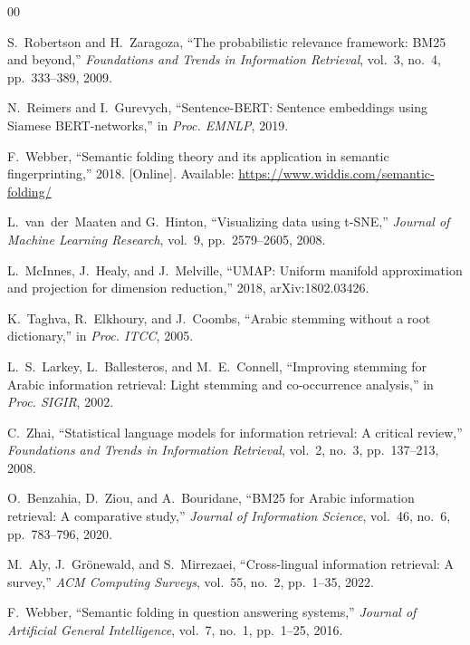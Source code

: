 \documentclass[conference]{IEEEtran}
\begin{document}
\clearpage
\begin{thebibliography}{00}

S.~Robertson and H.~Zaragoza, ``The probabilistic relevance framework:
BM25 and beyond,'' \textit{Foundations and Trends in Information
Retrieval}, vol.~3, no.~4, pp.~333--389, 2009.

N.~Reimers and I.~Gurevych, ``Sentence-BERT: Sentence embeddings using
Siamese BERT-networks,'' in \textit{Proc. EMNLP}, 2019.

F.~Webber, ``Semantic folding theory and its application in semantic
fingerprinting,'' 2018. [Online]. Available:
\url{https://www.widdis.com/semantic-folding/}

L.~van~der~Maaten and G.~Hinton, ``Visualizing data using t-SNE,''
\textit{Journal of Machine Learning Research}, vol.~9, pp.~2579--2605,
2008.

L.~McInnes, J.~Healy, and J.~Melville, ``UMAP: Uniform manifold
approximation and projection for dimension reduction,'' 2018,
arXiv:1802.03426.

K.~Taghva, R.~Elkhoury, and J.~Coombs, ``Arabic stemming without a root
dictionary,'' in \textit{Proc. ITCC}, 2005.

L.~S.~Larkey, L.~Ballesteros, and M.~E.~Connell, ``Improving stemming
for Arabic information retrieval: Light stemming and co-occurrence
analysis,'' in \textit{Proc. SIGIR}, 2002.

C.~Zhai, ``Statistical language models for information retrieval: A
critical review,'' \textit{Foundations and Trends in Information
Retrieval}, vol.~2, no.~3, pp.~137--213, 2008.

O.~Benzahia, D.~Ziou, and A.~Bouridane, ``BM25 for Arabic information
retrieval: A comparative study,'' \textit{Journal of Information
Science}, vol.~46, no.~6, pp.~783--796, 2020.

M.~Aly, J.~Gr\"{o}newald, and S.~Mirrezaei, ``Cross-lingual information
retrieval: A survey,'' \textit{ACM Computing Surveys}, vol.~55, no.~2,
pp.~1--35, 2022.

F.~Webber, ``Semantic folding in question answering systems,''
\textit{Journal of Artificial General Intelligence}, vol.~7, no.~1,
pp.~1--25, 2016.

\end{thebibliography}
\end{document}

